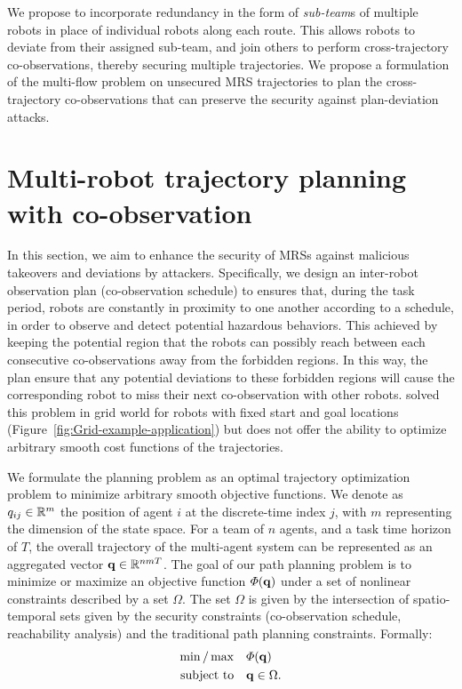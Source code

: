 \documentclass[journal]{IEEEtran}  %
\begin{document}
We propose to incorporate redundancy in the form of \emph{sub-team}s of multiple robots in place of individual robots along each route. This allows robots to deviate from their assigned sub-team, and join others to perform cross-trajectory co-observations, thereby securing multiple trajectories. We propose a formulation of the multi-flow problem on unsecured MRS trajectories to plan the cross-trajectory co-observations that can preserve the security against plan-deviation attacks.


\section{Multi-robot trajectory planning with co-observation}

In this section, we aim to enhance the security of MRSs against malicious takeovers and deviations by attackers. Specifically, we design an inter-robot observation plan (co-observation schedule) to ensures that, during the task period, robots are constantly in proximity to one another according to a schedule, in order to observe and detect potential hazardous behaviors. 
This achieved by keeping the potential region that the robots can possibly reach between each consecutive co-observations away from the forbidden regions. 
In this way, the plan ensure that any potential deviations to these forbidden regions will cause the corresponding robot to miss their next co-observation with other robots. \cite{wardega2019resilience} solved this problem in grid world for robots with fixed start and goal locations (Figure~\ref{fig:Grid-example-application}) but does not offer the ability to optimize arbitrary smooth cost functions of the trajectories. 

We formulate the planning problem as an optimal trajectory optimization problem to minimize arbitrary smooth objective functions. 
We denote as $q_{ij}\in\mathbb{R}^{m}{}$ the position of agent $i$ at the discrete-time index $j$, with $m$ representing the dimension of the state space. For a team of $n$ agents, and a task time horizon of $T$, the overall trajectory of the multi-agent system can be represented as an aggregated vector $\mathbf{q}\in \mathbb{R}^{n m T}{}$. 
The goal of our path planning problem is to minimize or maximize an objective function $\varPhi(\mathbf{q})$ under a set of nonlinear constraints described by a set $\Omega$. The set $\Omega$ is given by the intersection of spatio-temporal sets given by the security constraints (co-observation schedule, reachability analysis) and the traditional path planning constraints. Formally:
\begin{equation}\label{eq:general-problem}
	\begin{split}
		\min/\max & \quad \varPhi(\mathbf{q})\\
		\textrm{subject to} &\quad \mathbf{q} \in \Omega.
	\end{split}
\end{equation}
\end{document}
